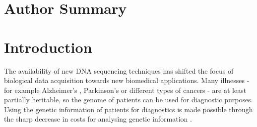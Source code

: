 \documentclass[10pt]{article}
\begin{document}
\section*{Author Summary}

\section*{Introduction}

The availability of new DNA sequencing techniques has shifted the focus of biological data acquisition towards new biomedical applications.
Many illnesses - for example Alzheimer's \cite{alzheimer}, Parkinson's \cite{parkinsons} or different types of cancers \cite{breastcancer,prostatecancer} - are at least partially heritable, so the genome of patients can be used for diagnostic purposes. Using the genetic information of patients for diagnostics is made possible through the sharp decrease in costs for analysing genetic information \cite{Brown1999}. 

\end{document}
